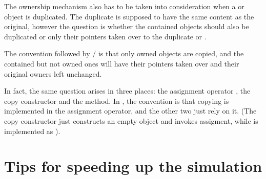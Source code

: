The ownership mechanism also has to be taken into consideration
when a  or  object is duplicated.
The duplicate is supposed to have the same content as the
original, however the question is whether the contained objects
should also be duplicated or only their pointers taken over
to the duplicate  or .

The convention followed by / is that
only owned objects are copied, and the contained but not owned ones
will have their pointers taken over and their original owners
left unchanged.

In fact, the same question arises in three places:
the assignment operator , the copy constructor
and the  method.
In {\opp}, the convention is that copying is implemented
in the assignment operator, and the other two just rely on it.
(The copy constructor just constructs an empty object and
invokes assigment, while 
is implemented as ).

%
%
%
%
%
%
%
%
%


\section{Tips for speeding up the simulation}

